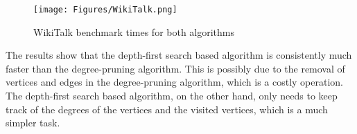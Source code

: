 \begin{figure}[H]
    \centering
    \texttt{[image: Figures/WikiTalk.png]}
    \caption{WikiTalk benchmark times for both algorithms}
    \label{fig:wikitalk}
\end{figure} 

The results show that the depth-first search based algorithm is consistently much faster than the degree-pruning algorithm. This is possibly due to the removal of vertices and edges in the degree-pruning algorithm, which is a costly operation. The depth-first search based algorithm, on the other hand, only needs to keep track of the degrees of the vertices and the visited vertices, which is a much simpler task.